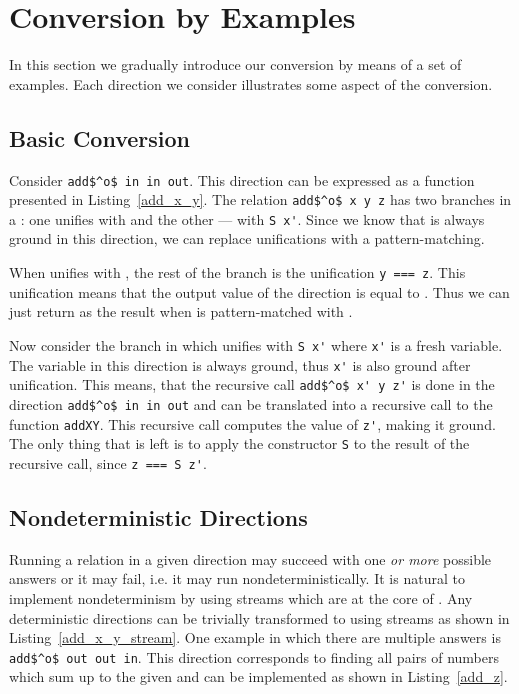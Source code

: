 \section{Conversion by Examples}

In this section we gradually introduce our conversion by means of a set of examples.
Each direction we consider illustrates some aspect of the conversion.


\subsection{Basic Conversion}

Consider \lstinline{add$^o$ in in out}.
This direction can be expressed as a function presented in Listing~\ref{add_x_y}.
The relation \lstinline{add$^o$ x y z} has two branches in a \conde: one unifies \x with \zero and the other --- with \lstinline{S x'}.
Since we know that \x is always ground in this direction, we can replace unifications with a pattern-matching.

When \x unifies with \zero, the rest of the \conde branch is the unification \lstinline{y === z}.
This unification means that the output value of the direction is equal to \y.
Thus we can just return \y as the result when \x is pattern-matched with \zero.

Now consider the \conde branch in which \x unifies with \lstinline{S x'} where \lstinline{x'} is a fresh variable.
The variable \x in this direction is always ground, thus \lstinline{x'} is also ground after unification.
This means, that the recursive call \lstinline{add$^o$ x' y z'} is done in the direction \lstinline{add$^o$ in in out} and can be translated into a recursive call to the function \lstinline{addXY}.
This recursive call computes the value of \lstinline{z'}, making it ground.
The only thing that is left is to apply the constructor \lstinline{S} to the result of the recursive call, since \lstinline{z === S z'}.




\subsection{Nondeterministic Directions}

Running a relation in a given direction may succeed with one \emph{or more} possible answers or it may fail, i.e. it may run nondeterministically.
It is natural to implement nondeterminism by using streams which are at the core of \mk.
Any deterministic directions can be trivially transformed to using streams as shown in Listing~\ref{add_x_y_stream}.
One example in which there are multiple answers is \lstinline{add$^o$ out out in}.
This direction corresponds to finding all pairs of numbers which sum up to the given \z and can be implemented as shown in Listing~\ref{add_z}.

